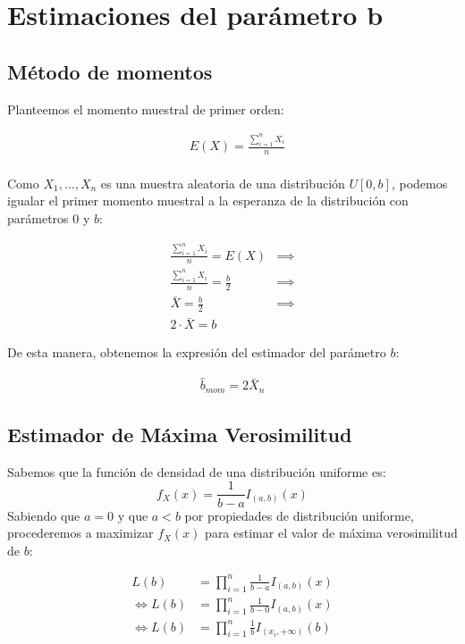 \section{Estimaciones del parámetro b}
\subsection{Método de momentos}
Planteemos el momento muestral de primer orden:

\begin{align*}
	&E(X) = \frac{\sum_{i=1}^{n}X_{i}}{n} \\
\end{align*}

Como $X_{1}, \dots, X_{n}$ es una muestra aleatoria de una distribución $U[0, b]$, podemos igualar el primer momento muestral a la esperanza de la distribución con parámetros $0$ y $b$:

\begin{align*}
	\frac{\sum_{i=1}^{n}X_{i}}{n} = E(X) &\implies \\
	\frac{\sum_{i=1}^{n}X_{i}}{n} = \frac{b}{2} &\implies \\
	\bar{X} = \frac{b}{2} &\implies \\
	2 \cdot \bar{X} = b&
\end{align*}

De esta manera, obtenemos la expresión del estimador del parámetro $b$:

\begin{align*}
	\hat{b}_{mom} = 2 \bar{X}_{n}
\end{align*}

\subsection{Estimador de Máxima Verosimilitud}
Sabemos que la función de densidad de una distribución uniforme es:
$$f_{X}(x)=\frac{1}{b - a}I_{(a, b)}(x)$$
Sabiendo que $a = 0$ y que $a < b$ por propiedades de distribución uniforme, procederemos a maximizar $f_{X}(x)$ para estimar el valor de máxima verosimilitud de $b$:

\begin{align*}
	L(b) &= \prod_{i=1}^{n}\frac{1}{b - a}I_{(a, b)}(x) \\
	\iff L(b) &= \prod_{i=1}^{n}\frac{1}{b - 0}I_{(a, b)}(x) \\
	\iff L(b) &= \prod_{i=1}^{n}\frac{1}{b}I_{(x_{i}, +\infty)}(b)
\end{align*}

